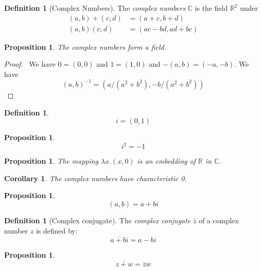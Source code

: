 \documentclass{article}
\let\qed\relax
\newtheorem{proposition}[axiom]{Proposition}
\newtheorem{corollary}{Corollary}[axiom]
\theoremstyle{definition}
\newtheorem{definition}[axiom]{Definition}
\begin{document}
    \begin{definition}[Complex Numbers]
        The \emph{complex numbers} $\mathbb{C}$ is the field $\mathbb{R}^2$ under
        \begin{align*}
            (a,b) + (c,d) & = (a+c,b+d) \\
            (a,b) (c,d) & = (ac-bd, ad+bc)
        \end{align*}
    \end{definition}

    \begin{proposition}
        The complex numbers form a field.
    \end{proposition}

    \begin{proof}
        \pf\ We have $0 = (0,0)$ and $1 = (1,0)$ and $-(a,b) = (-a,-b)$. We have
        \[ (a,b)^{-1} = (a/(a^2 + b^2),-b/(a^2 + b^2)) \] \qed
    \end{proof}

    \begin{definition}
        \[ i = (0,1) \]
    \end{definition}

    \begin{proposition}
        \[ i^2 = -1 \]
    \end{proposition}

    \begin{proposition}
        The mapping $\lambda x.(x,0)$ is an embedding of $\mathbb{R}$ in $\mathbb{C}$.
    \end{proposition}

    \begin{corollary}
        The complex numbers have characteristic 0.
    \end{corollary}

    \begin{proposition}
        \[ (a,b) = a + bi \]
    \end{proposition}

    \begin{definition}[Complex conjugate]
        The \emph{complex conjugate} $\overline{z}$ of a complex number $z$
        is defined by:
        \[ \overline{a+bi} = a-bi \]
    \end{definition}

    \begin{proposition}
        \[ \overline{z + w} = \overline{z} \overline{w} \]
    \end{proposition}
\end{document}
